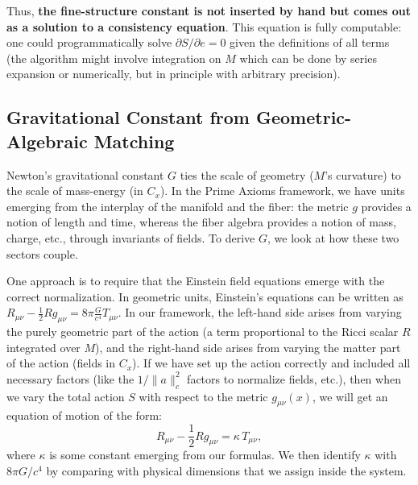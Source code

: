 \documentclass[11pt]{article}
\begin{document}
Thus, \textbf{the fine-structure constant is not inserted by hand but comes out as a solution to a consistency equation}. This equation is fully computable: one could programmatically solve $\partial S/\partial e=0$ given the definitions of all terms (the algorithm might involve integration on $M$ which can be done by series expansion or numerically, but in principle with arbitrary precision).

\subsection*{Gravitational Constant from Geometric-Algebraic Matching}

Newton's gravitational constant $G$ ties the scale of geometry ($M$'s curvature) to the scale of mass-energy (in $C_x$). In the Prime Axioms framework, we have units emerging from the interplay of the manifold and the fiber: the metric $g$ provides a notion of length and time, whereas the fiber algebra provides a notion of mass, charge, etc., through invariants of fields. To derive $G$, we look at how these two sectors couple.

One approach is to require that the Einstein field equations emerge with the correct normalization. In geometric units, Einstein's equations can be written as $R_{\mu\nu} - \frac{1}{2}Rg_{\mu\nu} = 8\pi \frac{G}{c^4} T_{\mu\nu}$. In our framework, the left-hand side arises from varying the purely geometric part of the action (a term proportional to the Ricci scalar $R$ integrated over $M$), and the right-hand side arises from varying the matter part of the action (fields in $C_x$). If we have set up the action correctly and included all necessary factors (like the $1/\|a\|_c^2$ factors to normalize fields, etc.), then when we vary the total action $S$ with respect to the metric $g_{\mu\nu}(x)$, we will get an equation of motion of the form:
\[ R_{\mu\nu} - \frac{1}{2}Rg_{\mu\nu} = \kappa\, T_{\mu\nu}, \]
where $\kappa$ is some constant emerging from our formulas. We then identify $\kappa$ with $8\pi G/c^4$ by comparing with physical dimensions that we assign inside the system. 
\end{document}
